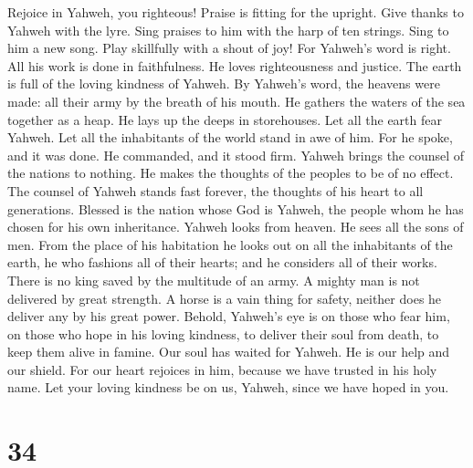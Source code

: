  Rejoice in Yahweh, you righteous! Praise is fitting for
the upright.  Give thanks to Yahweh with the lyre. Sing
praises to him with the harp of ten strings.  Sing to him
a new song. Play skillfully with a shout of joy!  For
Yahweh's word is right. All his work is done in faithfulness.
 He loves righteousness and justice. The earth is full of
the loving kindness of Yahweh.  By Yahweh's word, the
heavens were made: all their army by the breath of his mouth.
 He gathers the waters of the sea together as a heap. He
lays up the deeps in storehouses.  Let all the earth fear
Yahweh. Let all the inhabitants of the world stand in awe of him.
 For he spoke, and it was done. He commanded, and it stood
firm.  Yahweh brings the counsel of the nations to
nothing. He makes the thoughts of the peoples to be of no effect.
 The counsel of Yahweh stands fast forever, the thoughts
of his heart to all generations.  Blessed is the nation
whose God is Yahweh, the people whom he has chosen for his own
inheritance.  Yahweh looks from heaven. He sees all the
sons of men.  From the place of his habitation he looks
out on all the inhabitants of the earth,  he who fashions
all of their hearts; and he considers all of their works.
 There is no king saved by the multitude of an army. A
mighty man is not delivered by great strength.  A horse
is a vain thing for safety, neither does he deliver any by his great
power.  Behold, Yahweh's eye is on those who fear him, on
those who hope in his loving kindness,  to deliver their
soul from death, to keep them alive in famine.  Our soul
has waited for Yahweh. He is our help and our shield. 
For our heart rejoices in him, because we have trusted in his holy name.
 Let your loving kindness be on us, Yahweh, since we have
hoped in you.

\hypertarget{section-33}{%
\section{34}\label{section-33}}

